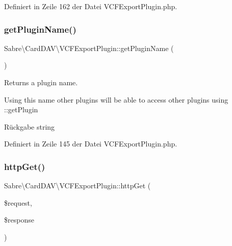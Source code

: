 Definiert in Zeile 162 der Datei V\+C\+F\+Export\+Plugin.\+php.

\mbox{\label{class_sabre_1_1_card_d_a_v_1_1_v_c_f_export_plugin_ac8c76a8b670ae37a73679c03a8009b74}} 
\subsubsection{\texorpdfstring{get\+Plugin\+Name()}{getPluginName()}}
{\footnotesize\ttfamily Sabre\textbackslash{}\+Card\+D\+A\+V\textbackslash{}\+V\+C\+F\+Export\+Plugin\+::get\+Plugin\+Name (\begin{DoxyParamCaption}{ }\end{DoxyParamCaption})}

Returns a plugin name.

Using this name other plugins will be able to access other plugins using \+::get\+Plugin

\begin{DoxyReturn}{Rückgabe}
string 
\end{DoxyReturn}


Definiert in Zeile 145 der Datei V\+C\+F\+Export\+Plugin.\+php.

\mbox{\label{class_sabre_1_1_card_d_a_v_1_1_v_c_f_export_plugin_ae177b83aabedab3b79efd4272dfe42bc}} 
\subsubsection{\texorpdfstring{http\+Get()}{httpGet()}}
{\footnotesize\ttfamily Sabre\textbackslash{}\+Card\+D\+A\+V\textbackslash{}\+V\+C\+F\+Export\+Plugin\+::http\+Get (\begin{DoxyParamCaption}\item[{\mbox{\hyperlink{interface_sabre_1_1_h_t_t_p_1_1_request_interface}{Request\+Interface}}}]{\$request,  }\item[{\mbox{\hyperlink{interface_sabre_1_1_h_t_t_p_1_1_response_interface}{Response\+Interface}}}]{\$response }\end{DoxyParamCaption})}

